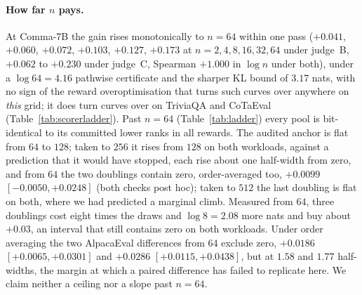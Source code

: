 \paragraph{How far $n$ pays.}
At Comma-7B the gain rises monotonically to $n=64$ within one pass ($+0.041$, $+0.060$, $+0.072$,
$+0.103$, $+0.127$, $+0.173$ at $n = 2,4,8,16,32,64$ under judge~B, $+0.062$ to $+0.230$ under judge~C,
Spearman $+1.000$ in $\log n$ under both), under a $\log 64 = 4.16$ pathwise certificate and the sharper
KL bound of $3.17$ nats, with no sign of the reward overoptimisation that turns such curves over
anywhere on \emph{this} grid; it does turn curves over on TriviaQA and CoTaEval
(Table~\ref{tab:scorerladder}). Past $n=64$ (Table~\ref{tab:ladder}) every pool is bit-identical to its
committed lower ranks in all rewards. The audited anchor is flat from $64$ to $128$; taken to $256$ it
rises from $128$ on both workloads, against a prediction that it would have stopped, each rise about one half-width from zero, and from $64$
the two doublings contain zero, order-averaged too, $+0.0099$ $[-0.0050, +0.0248]$ (both checks post hoc); taken to $512$
the last doubling is flat on both, where we had predicted a marginal climb. Measured from $64$, three
doublings cost eight times the draws and $\log 8 = 2.08$ more nats and buy about $+0.03$, an interval
that still contains zero on both workloads. Under order averaging the two AlpacaEval differences from
$64$ exclude zero, $+0.0186$ $[+0.0065, +0.0301]$ and $+0.0286$ $[+0.0115, +0.0438]$, but at $1.58$ and
$1.77$ half-widths, the margin at which a paired difference has failed to replicate here. We claim
neither a ceiling nor a slope past $n=64$.

